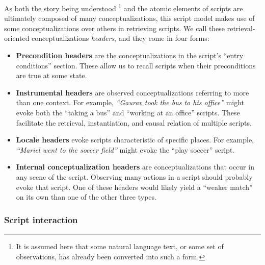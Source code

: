 As both the story being understood \footnote{It is assumed here that some natural language text, or some set of observations, has already been converted into such a form.} and the atomic elements of scripts are ultimately composed of many conceptualizations, this script model makes use of some conceptualizations over others in retrieving scripts. We call these retrieval-oriented conceptualizations \textit{headers}, and they come in four forms:

\begin{itemize}
    \item \textbf{Precondition headers} are the conceptualizations in the script's ``entry conditions'' section. These allow us to recall scripts when their preconditions are true at some state.%
    
    \item \textbf{Instrumental headers} are observed conceptualizations referring to more than one context. For example, \textit{``Gaurav took the bus to his office''} might evoke both the ``taking a bus'' and ``working at an office'' scripts. These facilitate the retrieval, instantiation, and causal relation of multiple scripts.
    
    \item \textbf{Locale headers} evoke scripts characteristic of specific places. For example, \textit{``Mariel went to the soccer field''} might evoke the ``play soccer'' script.
    
    \item \textbf{Internal conceptualization headers} are conceptualizations that occur in any scene of the script. Observing many actions in a script should probably evoke that script. One of these headers would likely yield a ``weaker match'' on its own than one of the other three types.
\end{itemize}


\subsubsection{Script interaction}

